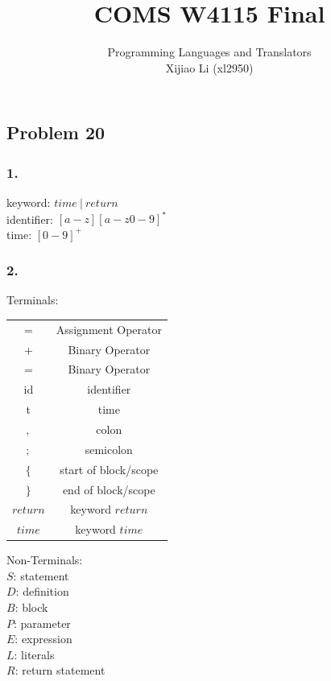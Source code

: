 \documentclass{article}
\title{COMS W4115
	Final}
\author{Programming Languages and Translators\medskip\\
	Xijiao Li (xl2950)}
\begin{document}
	\maketitle
	
	\newpage
	\subsection*{Problem 20}
	\subsubsection*{1.}
	keyword: $time~|~return$ \\
	identifier: $[a-z][a-z 0-9]^*$\\
	time: $[0-9]^+$\\
	
	\subsubsection*{2.}
	Terminals:
	\begin{table}[h!]
			\begin{tabular}{ |c|c|} 
				\toprule
				$=$ & Assignment Operator\\
				$+$ & Binary Operator\\
				$=$ & Binary Operator\\
				id &  identifier\\
				t &  time\\
				$,$ &  colon\\
				$;$ &  semicolon\\
				$\{$ &  start of block/scope\\
				$\}$ &  end of block/scope\\
				$return$ &  keyword $return$\\
				$time$ &  keyword $time$\\
				\bottomrule
			\end{tabular}
	\end{table}
	
	\noindent Non-Terminals:\\
	$S$: statement\\
	$D$: definition\\
	$B$: block\\
	$P$: parameter \\
	$E$: expression \\
	$L$: literals \\
	$R$: return statement \\
	
\end{document}
